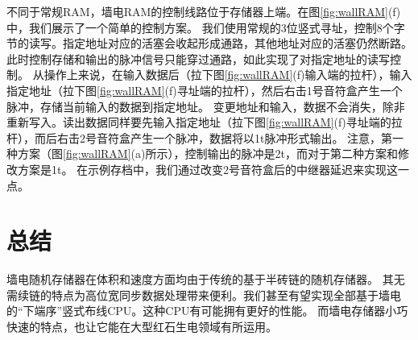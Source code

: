 \documentclass[UTF8,12pt,punct=kaiming,fontset=none]{ctexart}
\begin{document}
不同于常规RAM，墙电RAM的控制线路位于存储器上端。在图\ref{fig:wallRAM}(f)中，我们展示了一个简单的控制方案。
我们使用常规的3位竖式寻址，控制8个字节的读写。指定地址对应的活塞会收起形成通路，其他地址对应的活塞仍然断路。
此时控制存储和输出的脉冲信号只能穿过通路，如此实现了对指定地址的读写控制。
从操作上来说，在输入数据后（拉下图\ref{fig:wallRAM}(f)输入端的拉杆），输入指定地址（拉下图\ref{fig:wallRAM}(f)寻址端的拉杆），然后右击1号音符盒产生一个脉冲，存储当前输入的数据到指定地址。
变更地址和输入，数据不会消失，除非重新写入。读出数据同样要先输入指定地址（拉下图\ref{fig:wallRAM}(f)寻址端的拉杆），而后右击2号音符盒产生一个脉冲，数据将以1t脉冲形式输出。
注意，第一种方案（图\ref{fig:wallRAM}(a)所示），控制输出的脉冲是2t，而对于第二种方案和修改方案是1t。
在示例存档中，我们通过改变2号音符盒后的中继器延迟来实现这一点。

\section{总结}
墙电随机存储器在体积和速度方面均由于传统的基于半砖链的随机存储器。
其无需续链的特点为高位宽同步数据处理带来便利。我们甚至有望实现全部基于墙电的“下端序”竖式布线CPU。这种CPU有可能拥有更好的性能。
而墙电存储器小巧快速的特点，也让它能在大型红石生电领域有所运用。



\end{document}
